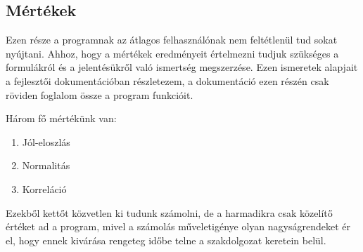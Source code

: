 \documentclass[12pt]{article}
\begin{document}
	\subsection{Mértékek}
	Ezen része a programnak az átlagos felhasználónak nem feltétlenül tud sokat nyújtani. Ahhoz, hogy a mértékek eredményeit értelmezni tudjuk szükséges a formulákról és a jelentésükről való ismertség megszerzése. Ezen ismeretek alapjait a fejlesztői dokumentációban részletezem, a dokumentáció ezen részén csak röviden foglalom össze a program funkcióit.
	
	Három fő mértékünk van:
	\begin{enumerate}
		\bfseries \item Jól-eloszlás
		\bfseries \item Normalitás 
		\bfseries \item Korreláció
	\end{enumerate}
	Ezekből kettőt közvetlen ki tudunk számolni, de a harmadikra csak közelítő értéket ad a program, mivel a számolás műveletigénye olyan nagyságrendeket ér el, hogy ennek kivárása rengeteg időbe telne a szakdolgozat keretein belül.
	
\end{document}
